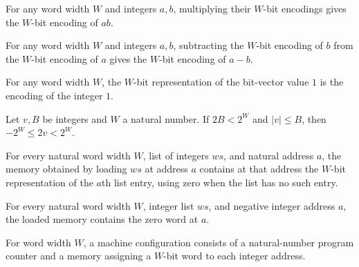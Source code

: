 \begin{theorem}
\label{WordRAM.wd_mul}
\leanok
{}
For any word width $W$ and integers $a,b$, multiplying their $W$-bit encodings gives the
$W$-bit encoding of $ab$.
\end{theorem}

\begin{theorem}
\label{WordRAM.wd_sub}
\leanok
{}
For any word width $W$ and integers $a,b$, subtracting the $W$-bit encoding of $b$ from
the $W$-bit encoding of $a$ gives the $W$-bit encoding of $a-b$.
\end{theorem}

\begin{theorem}
\label{WordRAM.wd_one}
\leanok
{}
For any word width $W$, the $W$-bit representation of the bit-vector value $1$ is the
encoding of the integer $1$.
\end{theorem}

\begin{theorem}
\label{WordRAM.inRange_of_abs_le}
\leanok
{}
Let $v,B$ be integers and $W$ a natural number. If $2B<2^W$ and $|v|\le B$, then
$-2^W\le 2v<2^W$.
\end{theorem}

\begin{theorem}
\label{WordRAM.loadWords_mem_nat}
\leanok
{}
For every natural word width $W$, list of integers $ws$, and natural address $a$, the
memory obtained by loading $ws$ at address $a$ contains at that address the $W$-bit
representation of the $a$th list entry, using zero when the list has no such entry.
\end{theorem}

\begin{theorem}
\label{WordRAM.loadWords_mem_neg}
\leanok
{}
For every natural word width $W$, integer list $ws$, and negative integer address $a$,
the loaded memory contains the zero word at $a$.
\end{theorem}

\begin{definition}
\label{WordRAM.Cfg}
\leanok
For word width $W$, a machine configuration consists of a natural-number program counter
and a memory assigning a $W$-bit word to each integer address.
\end{definition}


